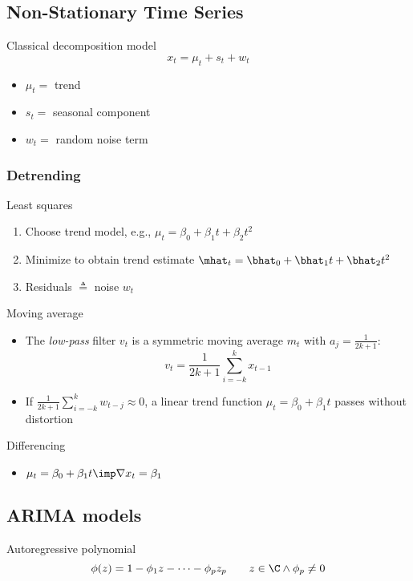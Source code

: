 \documentclass[landscape]{article}
\begin{document}
\begin{multicols*}{2}
\subsection{Non-Stationary Time Series}

Classical decomposition model
\[x_t = \mu_t + s_t + w_t\]
\begin{itemize}
  \item $\mu_t =$ trend
  \item $s_t =$ seasonal component
  \item $w_t =$ random noise term
\end{itemize}

\subsubsection{Detrending}

Least squares
\begin{enumerate}
  \item Choose trend model, e.g.,
    $\mu_t = \beta_0 + \beta_1 t + \beta_2 t^2$
  \item Minimize \rss to obtain trend estimate
    $\mhat_t = \bhat_0 + \bhat_1 t + \bhat_2 t^2$
  \item Residuals $\triangleq$ noise $w_t$
\end{enumerate}

Moving average
\begin{itemize}
  \item The \emph{low-pass} filter $v_t$ is a symmetric moving average $m_t$
    with $a_j = \frac{1}{2k+1}$:
    \[v_t = \frac{1}{2k+1} \sum_{i=-k}^k x_{t-1}\]
  \item If $\frac{1}{2k+1} \sum_{i=-k}^k w_{t-j} \approx 0$,
    a linear trend function $\mu_t = \beta_0 + \beta_1t$ passes without
    distortion
\end{itemize}

Differencing
\begin{itemize}
  \item $\mu_t = \beta_0 + \beta_1t \imp \nabla x_t = \beta_1$
\end{itemize}

\subsection{ARIMA models}

Autoregressive polynomial
\[\phi(z) = 1 - \phi_1 z - \cdots - \phi_p z_p
\qquad z \in \C \wedge \phi_p \neq 0\]


\end{multicols*}
\end{document}
